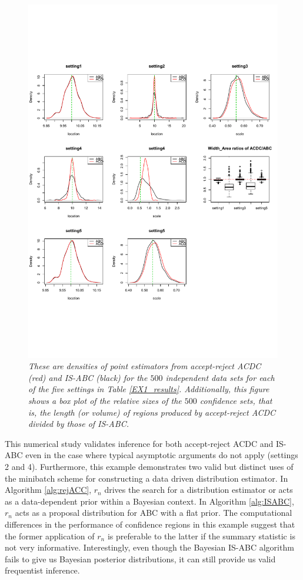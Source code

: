\begin{figure}
\centering
\caption{{\it These are densities of point estimators from accept-reject ACDC (red) and IS-ABC (black) for the $500$ independent data sets for each of the five settings in Table \ref{EX1_results}. Additionally, this figure shows a box plot of the relative sizes of the $500$ confidence sets, that is, the length (or volume) of regions produced by accept-reject ACDC %
divided by those of IS-ABC.}}\label{fig:cauchy_loc_ex}
\includegraphics[width=0.9\linewidth]{Images/Cauchy_one_run.pdf}
\end{figure}	

This numerical study validates inference for both 
accept-reject ACDC and IS-ABC %
even in the case where typical asymptotic arguments do not apply (settings 2 and 4). 
Furthermore, this example demonstrates two valid but distinct uses of the minibatch scheme for constructing a data driven distribution estimator. In Algorithm \ref{alg:rejACC}, $r_n$ drives the search for a distribution estimator or acts as a data-dependent prior within a Bayesian context. In Algorithm \ref{alg:ISABC}, $r_n$ acts as a proposal distribution for ABC with a flat prior. The computational differences in the performance of confidence regions in this example suggest that the former application of $r_n$ is preferable to the latter if the summary statistic is not very informative. Interestingly, even though the Bayesian IS-ABC algorithm fails to give us Bayesian posterior distributions, it can still provide us valid frequentist inference.  


